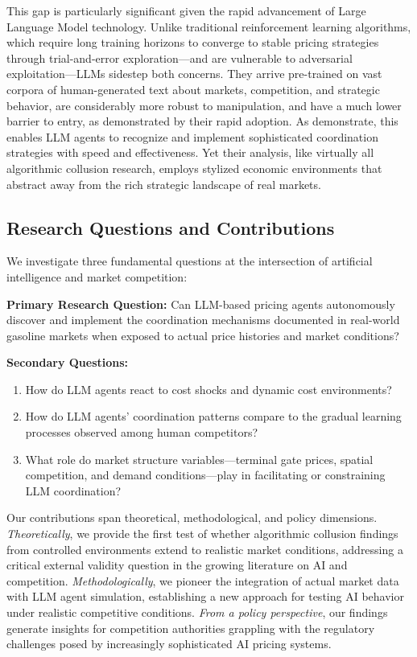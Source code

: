 This gap is particularly significant given the rapid advancement of Large Language Model technology. Unlike traditional reinforcement learning algorithms, which require long training horizons to converge to stable pricing strategies through trial-and-error exploration—and are vulnerable to adversarial exploitation—LLMs sidestep both concerns. They arrive pre-trained on vast corpora of human-generated text about markets, competition, and strategic behavior, are considerably more robust to manipulation, and have a much lower barrier to entry, as demonstrated by their rapid adoption. As \textcite{fish_algorithmic_2025} demonstrate, this enables LLM agents to recognize and implement sophisticated coordination strategies with speed and effectiveness. Yet their analysis, like virtually all algorithmic collusion research, employs stylized economic environments that abstract away from the rich strategic landscape of real markets.

\subsection{Research Questions and Contributions}

We investigate three fundamental questions at the intersection of artificial intelligence and market competition:

\textbf{Primary Research Question:} Can LLM-based pricing agents autonomously discover and implement the coordination mechanisms documented in real-world gasoline markets when exposed to actual price histories and market conditions?

\textbf{Secondary Questions:}
\begin{enumerate}
    \item How do LLM agents react to cost shocks and dynamic cost environments?
    \item How do LLM agents' coordination patterns compare to the gradual learning processes observed among human competitors?
    \item What role do market structure variables—terminal gate prices, spatial competition, and demand conditions—play in facilitating or constraining LLM coordination?
\end{enumerate}

Our contributions span theoretical, methodological, and policy dimensions. \emph{Theoretically}, we provide the first test of whether algorithmic collusion findings from controlled environments extend to realistic market conditions, addressing a critical external validity question in the growing literature on AI and competition. \emph{Methodologically}, we pioneer the integration of actual market data with LLM agent simulation, establishing a new approach for testing AI behavior under realistic competitive conditions. \emph{From a policy perspective}, our findings generate insights for competition authorities grappling with the regulatory challenges posed by increasingly sophisticated AI pricing systems.

